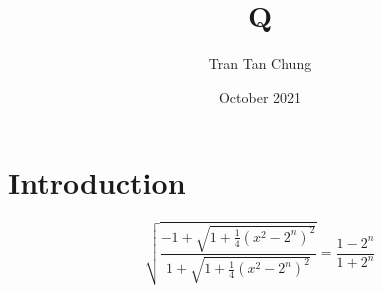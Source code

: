 \documentclass{article}
\title{Q}
\author{Tran Tan Chung}
\date{October 2021}
\begin{document}
\maketitle


\section{Introduction}

\begin{equation}
\sqrt{\frac{-1+{\sqrt{1+{\frac{1}{4}}(x^{2}-2^{n})^{2}}}}{1+{\sqrt{1+{\frac{1}{4}}(x^{2}-2^{n})^{2}}}}}={\frac{1-2^{n}}{1+2^{n}}} 
\end{equation}
\end{document}
